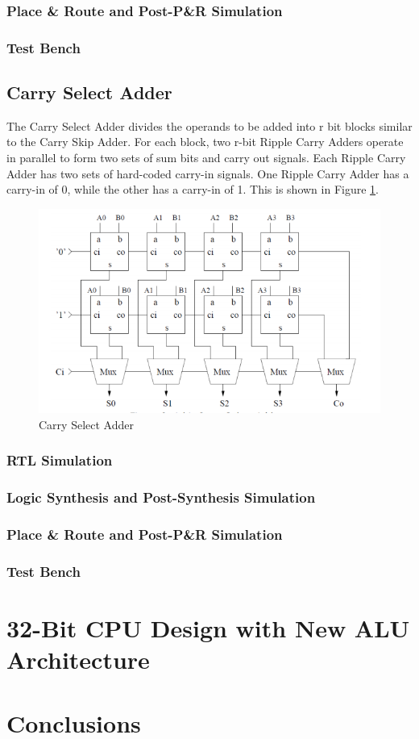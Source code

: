 \documentclass[12pt]{article}
\begin{document}
\subsubsection{Place \& Route and Post-P\&R Simulation}

\subsubsection{Test Bench}

\subsection{Carry Select Adder}
The Carry Select Adder divides the operands to be added into r bit blocks similar to the Carry Skip Adder. For each block, two r-bit Ripple Carry Adders operate in parallel to form two sets of sum bits and carry out signals. Each Ripple Carry Adder has two sets of hard-coded carry-in signals. One Ripple Carry Adder has a carry-in of 0, while the other has a carry-in of 1. This is shown in Figure \ref{fig:carry-select}.

\begin{figure}[H]
\centering
\includegraphics[width=0.7\linewidth]{carry-select}
\caption{Carry Select Adder}
\label{fig:carry-select}
\end{figure}

\subsubsection{RTL Simulation}

\subsubsection{Logic Synthesis and Post-Synthesis Simulation}

\subsubsection{Place \& Route and Post-P\&R Simulation}

\subsubsection{Test Bench}

\section{32-Bit CPU Design with New ALU Architecture}
\section{Conclusions}
\end{document}

